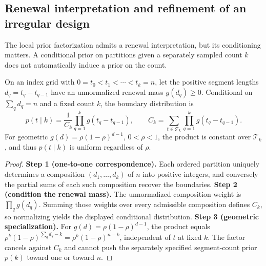 \subsection{Renewal interpretation and refinement of an irregular design}
\label{sec:design-refinement}
The local prior factorization admits a renewal interpretation, but its conditioning matters. A conditional prior on partitions given a separately sampled count $k$ does not automatically induce a prior on the count.

\begin{proposition}
\label{prop:renewal-equivalence-paper}
On an index grid with $0=t_0<t_1<\cdots<t_k=n$, let the positive segment lengths $d_q=t_q-t_{q-1}$ have an unnormalized renewal mass $g(d_q)\ge0$. Conditional on $\sum_qd_q=n$ and a fixed count $k$, the boundary distribution is
\[
p(t\mid k)=\frac{1}{C_k}\prod_{q=1}^{k}g(t_q-t_{q-1}),\qquad
C_k=\sum_{t\in\mathcal T_k}\prod_{q=1}^{k}g(t_q-t_{q-1}).
\]
For geometric $g(d)=\rho(1-\rho)^{d-1}$, $0<\rho<1$, the product is constant over $\mathcal T_k$, and thus $p(t\mid k)$ is uniform regardless of $\rho$.
\end{proposition}
\begin{proof}
\textbf{Step 1 (one-to-one correspondence).} Each ordered partition uniquely determines a composition $(d_1,\ldots,d_k)$ of $n$ into positive integers, and conversely the partial sums of each such composition recover the boundaries.
\textbf{Step 2 (condition the renewal mass).} The unnormalized composition weight is $\prod_qg(d_q)$. Summing those weights over every admissible composition defines $C_k$, so normalizing yields the displayed conditional distribution.
\textbf{Step 3 (geometric specialization).} For $g(d)=\rho(1-\rho)^{d-1}$, the product equals $\rho^k(1-\rho)^{\sum_qd_q-k}=\rho^k(1-\rho)^{n-k}$, independent of $t$ at fixed $k$. The factor cancels against $C_k$ and cannot push the separately specified segment-count prior $p(k)$ toward one or toward $n$.
\end{proof}

